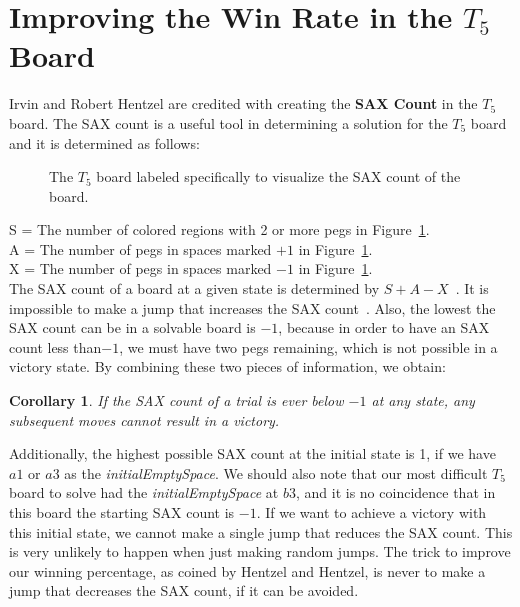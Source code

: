 \documentclass{article}
\newtheorem*{corollary}{Corollary}
\newcommand\tab[1][.5cm]{\hspace*{#1}}
\begin{document}
\section{Improving the Win Rate in the $T_5$ Board}
\label{4SAX}

Irvin and Robert Hentzel are credited with creating the \textbf{SAX Count} in the $T_5$ board. The SAX count is a useful tool in determining a solution for the $T_5$ board and it is determined as follows:\\

\begin{figure}[htb]
\centering
{}
\caption{The $T_5$ board labeled specifically to visualize the SAX count of the board.}
\label{fig9}
\end{figure}

\large S = The number of colored regions with 2 or more pegs in Figure~\ref{fig9}.\\
\tab\large A = The number of pegs in spaces marked $+1$ in Figure~\ref{fig9}.\\
\tab\large X =  The number of pegs in spaces marked $-1$ in Figure~\ref{fig9}.\\

\normalsize The SAX count of a board at a given state is determined by $S+A-X$~\cite{Hentzel}. It is impossible to make a jump that increases the SAX count~\cite{Bell}. Also, the lowest the SAX count can be in a solvable board is $-1$, because in order to have an SAX count less than$-1$, we must have two pegs remaining, which is not possible in a victory state. By combining these two pieces of information, we obtain:
\begin{corollary}
If the SAX count of a trial is ever below $-1$ at any state, any subsequent moves cannot result in a victory.
\end{corollary} 
Additionally, the highest possible SAX count at the initial state is 1, if we have $a1$ or $a3$ as the \textit{initialEmptySpace}. We should also note that our most difficult $T_5$ board to solve had the \textit{initialEmptySpace} at $b3$, and it is no coincidence that in this board the starting SAX count is $-1$. If we want to achieve a victory with this initial state, we cannot make a single jump that reduces the SAX count. This is very unlikely to happen when just making random jumps. The trick to improve our winning percentage, as coined by Hentzel and Hentzel, is never to make a jump that decreases the SAX count, if it can be avoided.
\end{document}

